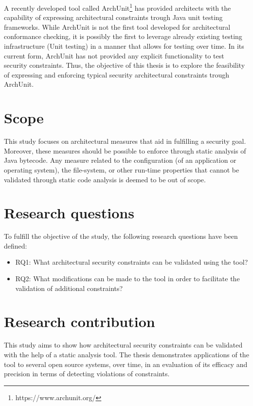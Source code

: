 A recently developed tool called ArchUnit\footnote{https://www.archunit.org/} has provided architects with the capability of expressing architectural constraints trough Java unit testing frameworks. While ArchUnit is not the first tool developed for architectural conformance checking, it is possibly the first to leverage already existing testing infrastructure (Unit testing) in a manner that allows for testing over time. In its current form, ArchUnit has not provided any explicit functionality to test security constraints. Thus, the objective of this thesis is to explore the feasibility of expressing and enforcing typical security architectural constraints trough ArchUnit.

\section{Scope}

This study focuses on architectural measures that aid in fulfilling a security goal. Moreover, these measures should be possible to enforce through static analysis of Java bytecode. Any measure related to the configuration (of an application or operating system), the file-system, or other run-time properties that cannot be validated through static code analysis is deemed to be out of scope.

\section{Research questions}
To fulfill the objective of the study, the following research questions have been defined:

\begin{itemize}
    \item RQ1: What architectural security constraints can be validated using the tool?
    \item RQ2: What modifications can be made to the tool in order to facilitate the validation of additional constraints?
\end{itemize}

\section{Research contribution}

This study aims to show how architectural security constraints can be validated with the help of a static analysis tool. The thesis demonstrates applications of the tool to several open source systems, over time, in an evaluation of its efficacy and precision in terms of detecting violations of constraints.

